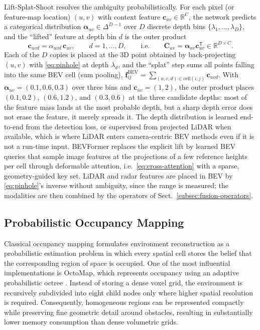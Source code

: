 \documentclass[graybox,envcountchap]{style/SNmono}
\begin{document}
Lift-Splat-Shoot \cite{philion2020_lss} resolves the ambiguity probabilistically. For each pixel (or feature-map location) $(u,v)$ with context feature $\mathbf{c}_{uv}\in\mathbb{R}^{C}$, the network predicts a categorical distribution $\boldsymbol{\alpha}_{uv}\in\Delta^{D-1}$ over $D$ discrete depth bins $\{\lambda_1,\ldots,\lambda_D\}$, and the ``lifted'' feature at depth bin $d$ is the outer product
\begin{equation}
\mathbf{c}_{uvd}=\alpha_{uvd}\,\mathbf{c}_{uv},\qquad d=1,\ldots,D,
\qquad\text{i.e.}\qquad
\mathbf{C}_{uv}=\boldsymbol{\alpha}_{uv}\mathbf{c}_{uv}^{\mathsf T}\in\mathbb{R}^{D\times C}.
\label{eq:lss-lift}
\end{equation}
Each of the $D$ copies is placed at the 3D point obtained by back-projecting $(u,v)$ with \eqref{eq:pinhole} at depth $\lambda_d$, and the ``splat'' step sums all points falling into the same BEV cell (sum pooling), $\mathbf{f}^{\mathrm{BEV}}_{ij}=\sum_{(u,v,d)\in\mathrm{cell}(i,j)}\mathbf{c}_{uvd}$. With $\boldsymbol{\alpha}_{uv}=(0.1,0.6,0.3)$ over three bins and $\mathbf{c}_{uv}=(1,2)$, the outer product places $(0.1,0.2)$, $(0.6,1.2)$, and $(0.3,0.6)$ at the three candidate depths: most of the feature mass lands at the most probable depth, but a sharp depth error does not erase the feature, it merely spreads it. The depth distribution is learned end-to-end from the detection loss, or supervised from projected LiDAR when available, which is where LiDAR enters camera-centric BEV methods even if it is not a run-time input. BEVFormer \cite{li2022_bevformer} replaces the explicit lift by learned BEV queries that sample image features at the projections of a few reference heights per cell through deformable attention, i.e.\ \eqref{eq:cross-attention} with a sparse, geometry-guided key set. LiDAR and radar features are placed in BEV by \eqref{eq:pinhole}'s inverse without ambiguity, since the range is measured; the modalities are then combined by the operators of Sect.~\ref{subsec:fusion-operators}.

\subsection{Probabilistic Occupancy Mapping}
\label{subsec:occupancy-mapping}

Classical occupancy mapping formulates environment reconstruction as a probabilistic estimation problem in which every spatial cell stores the belief that the corresponding region of space is occupied. One of the most influential implementations is OctoMap, which represents occupancy using an adaptive probabilistic octree \cite{hornung2013_octomap}. Instead of storing a dense voxel grid, the environment is recursively subdivided into eight child nodes only where higher spatial resolution is required. Consequently, homogeneous regions can be represented compactly while preserving fine geometric detail around obstacles, resulting in substantially lower memory consumption than dense volumetric grids.
\end{document}

